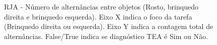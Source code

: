 \documentclass{article}
\begin{document}
\begin{figure}[]
\caption{RJA - Número de alternâncias entre objetos (Rosto, brinquedo direita e brinquedo esquerda). Eixo X indica o foco da tarefa (Brinquedo direita ou esquerda). Eixo Y indica a contagem total de alternâncias. False/True indica se diagnóstico TEA é Sim ou Não.}
\noindent{}
\centering
\end{figure}
\end{document}
